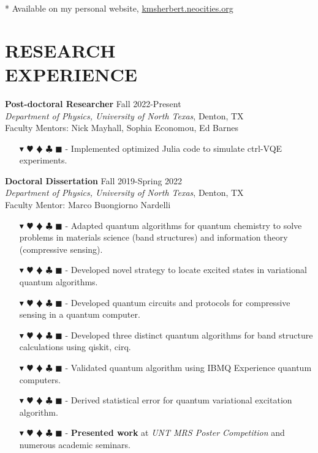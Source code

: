 \documentclass[overlapped, 10pt]{res} %
\newcommand{\physics}{$\blacktriangledown$}
\newcommand{\biochem}{$\varheartsuit$}
\newcommand{\shannon}{$\vardiamondsuit$}
\newcommand{\classic}{$\clubsuit$}
\newcommand{\quantum}{$\blacksquare$}
\newcommand{\physicscolor}{\color{YellowOrange}}
\newcommand{\biochemcolor}{\color{Emerald}}
\newcommand{\shannoncolor}{\color{Goldenrod}}
\newcommand{\classiccolor}{\color{Cyan}}
\newcommand{\quantumcolor}{\color{RedOrange}}
\newcommand{\tag}[1]{
    {\IfSubStr{#1}{\physics}{\physicscolor}{\color{White}}\physics}
    {\IfSubStr{#1}{\biochem}{\biochemcolor}{\color{White}}\biochem}
    {\IfSubStr{#1}{\shannon}{\shannoncolor}{\color{White}}\shannon}
    {\IfSubStr{#1}{\classic}{\classiccolor}{\color{White}}\classic}
    {\IfSubStr{#1}{\quantum}{\quantumcolor}{\color{White}}\quantum}
}
\begin{document}
\begin{resume}
* Available on my personal website, \href{kmsherbert.neocities.org}{kmsherbert.neocities.org}


\section{RESEARCH\\EXPERIENCE}

\textbf{Post-doctoral Researcher} \hfill Fall 2022-Present \\
\textit{Department of Physics, University of North Texas}, Denton, TX \\
Faculty Mentors: Nick Mayhall, Sophia Economou, Ed Barnes
\begin{itemize} \itemsep -2pt %
\item[\tag{\physics\biochem\classic\quantum}-] Implemented optimized Julia code to simulate ctrl-VQE experiments.
\end{itemize}

\textbf{Doctoral Dissertation} \hfill Fall 2019-Spring 2022 \\
\textit{Department of Physics, University of North Texas}, Denton, TX \\
Faculty Mentor: Marco Buongiorno Nardelli
\begin{itemize} \itemsep -2pt %
\item[\tag{\physics\biochem\shannon\quantum}-] Adapted quantum algorithms for quantum chemistry to solve problems in materials science (band structures) and information theory (compressive sensing).
\item[\tag{\physics\quantum}-] Developed novel strategy to locate excited states in variational quantum algorithms.
\item[\tag{\shannon\quantum}-] Developed quantum circuits and protocols for compressive sensing in a quantum computer.
\item[\tag{\physics\quantum}-] Developed three distinct quantum algorithms for band structure calculations using qiskit, cirq.
\item[\tag{\physics\quantum}-] Validated quantum algorithm using IBMQ Experience quantum computers.
\item[\tag{\physics\quantum}-] Derived statistical error for quantum variational excitation algorithm.
\item[\tag{}-] \textbf{Presented work} at \textit{UNT MRS Poster Competition} and numerous academic seminars.
\end{itemize}


\end{resume}
\end{document}
